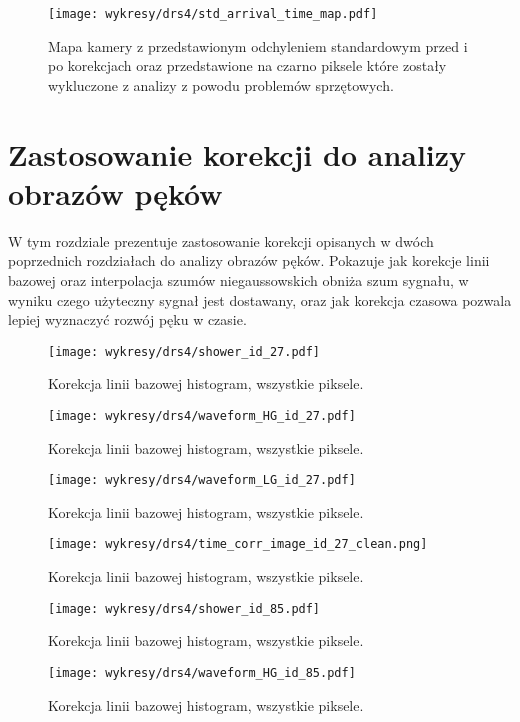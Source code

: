 \documentclass[a4paper,11pt,twoside]{article}
\begin{document}
\begin{figure}[H] 
\centering
\texttt{[image: wykresy/drs4/std\_arrival\_time\_map.pdf]}
\caption{Mapa kamery z przedstawionym odchyleniem standardowym przed i po korekcjach oraz przedstawione na czarno piksele które zostały wykluczone z analizy z powodu problemów sprzętowych.}
\label{fig:std_map_time_corr}
\end{figure}
\newpage
\section{Zastosowanie korekcji do analizy obrazów pęków}
W tym rozdziale prezentuje zastosowanie korekcji opisanych w dwóch poprzednich rozdziałach do analizy obrazów pęków. Pokazuje jak korekcje linii bazowej oraz interpolacja szumów niegaussowskich obniża szum sygnału, w wyniku czego użyteczny sygnał jest dostawany, oraz jak korekcja czasowa pozwala lepiej wyznaczyć rozwój pęku w czasie.
\begin{figure}[H] 
\centering
\texttt{[image: wykresy/drs4/shower\_id\_27.pdf]}
\caption{Korekcja linii bazowej histogram, wszystkie piksele.}
\label{fig:muon_image}
\end{figure}

\begin{figure}[H] 
\centering
\texttt{[image: wykresy/drs4/waveform\_HG\_id\_27.pdf]}
\caption{Korekcja linii bazowej histogram, wszystkie piksele.}
\label{fig:muon_image}
\end{figure}

\begin{figure}[H] 
\centering
\texttt{[image: wykresy/drs4/waveform\_LG\_id\_27.pdf]}
\caption{Korekcja linii bazowej histogram, wszystkie piksele.}
\label{fig:muon_image}
\end{figure}

\begin{figure}[H] 
\centering
\texttt{[image: wykresy/drs4/time\_corr\_image\_id\_27\_clean.png]}
\caption{Korekcja linii bazowej histogram, wszystkie piksele.}
\label{fig:muon_image}
\end{figure}

\begin{figure}[H] 
\centering
\texttt{[image: wykresy/drs4/shower\_id\_85.pdf]}
\caption{Korekcja linii bazowej histogram, wszystkie piksele.}
\label{fig:muon_image}
\end{figure}

\begin{figure}[H] 
\centering
\texttt{[image: wykresy/drs4/waveform\_HG\_id\_85.pdf]}
\caption{Korekcja linii bazowej histogram, wszystkie piksele.}
\label{fig:muon_image}
\end{figure}
\end{document}
